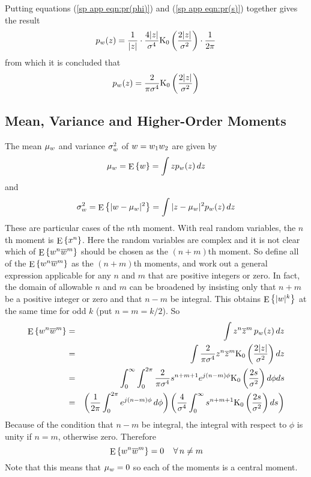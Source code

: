 Putting equations (\ref{sp app eqn:pr(phi)}) and (\ref{sp app eqn:pr(s)})
together gives the result
\begin{equation}
{p}_{{w}}(z)=\frac{1}{|z|}\cdot\frac{4|z|}{{\sigma^{4}}}{\mathop{\rm K_0}\nolimits\left(\frac{2|z|}{{\sigma^2}}\right)}\cdot
\frac{1}{2\pi}
\end{equation}
from which it is concluded that
\begin{equation}
{p}_{{w}}(z)=\frac{2}{\pi{\sigma^{4}}}{\mathop{\rm K_0}\nolimits\left(\frac{2|z|}{{\sigma^2}}\right)}
\end{equation}

\subsection{Mean, Variance and Higher-Order Moments}

The mean $\mu_{{w}}$ and variance $\sigma_{{w}}^2$ of ${w}={w_1}{w_2}$ are given 
by
\begin{equation}
\mu_{{w}}={\mathop{\rm E}\nolimits\left\{{w}\right\}}=\int z{p}_{{w}}(z)\,dz
\end{equation}
and
\begin{equation}
\sigma_{{w}}^2={\mathop{\rm E}\nolimits\left\{|{w}-\mu_{{w}}|^2\right\}}=\int |z-\mu_{{w}}|^2{p}_{{w}}(z)\,dz
\end{equation}
These are particular cases of the $n$th moment.  With real random variables,
the $n$th moment is ${\mathop{\rm E}\nolimits\left\{x^n\right\}}$.  Here the random variables are complex and it
is not clear which of ${\mathop{\rm E}\nolimits\left\{{w}^n\overline{{w}}^m\right\}}$ should be chosen as the $(n+m)$th
moment.  So define all of the ${\mathop{\rm E}\nolimits\left\{{w}^n\overline{{w}}^m\right\}}$ as the $(n+m)$th
moments, and work out a general expression applicable for any $n$ and $m$
that are positive integers or zero.  In fact, the domain of allowable $n$
and $m$ can be broadened by insisting only that $n+m$ be a positive integer
or zero and that $n-m$ be integral.  This obtains ${\mathop{\rm E}\nolimits\left\{|{w}|^k\right\}}$ at the
same time for odd $k$ (put $n=m=k/2$).  So
\begin{eqnarray}
{\mathop{\rm E}\nolimits\left\{{w}^n\overline{{w}}^m\right\}}&=&\int z^n\overline{z}^m\,{p}_{{w}}(z)\,dz {\nonumber}\\
&=&\int \frac{2}{\pi{\sigma^{4}}}z^n\overline{z}^m{\mathop{\rm K_0}\nolimits\left(\frac{2|z|}{{\sigma^2}}\right)}\,dz {\nonumber}\\
&=&\int_0^{\infty}\int_0^{2\pi}\frac{2}{\pi{\sigma^{4}}}
s^{n+m+1}{e^{j(n-m)\phi}}{\mathop{\rm K_0}\nolimits\left(\frac{2s}{{\sigma^2}}\right)}\,d\phi ds {\nonumber}\\
&=&\left(\frac{1}{2\pi}\int_0^{2\pi}{e^{j(n-m)\phi}}\,d\phi\right)
\left(\frac{4}{{\sigma^{4}}}\int_0^{\infty}s^{n+m+1}{\mathop{\rm K_0}\nolimits\left(\frac{2s}{{\sigma^2}}\right)}\,ds\right)
\end{eqnarray}
Because of the condition that $n-m$ be integral, the integral with respect 
to $\phi$ is unity if $n=m$, otherwise zero.  Therefore 
\begin{equation}
{\mathop{\rm E}\nolimits\left\{{w}^n\overline{{w}}^m\right\}}=0\;\;\;\;\forall\,n\neq m
\end{equation}
Note that this means that $\mu_{{w}}=0$ so each of the moments is a central
moment.

